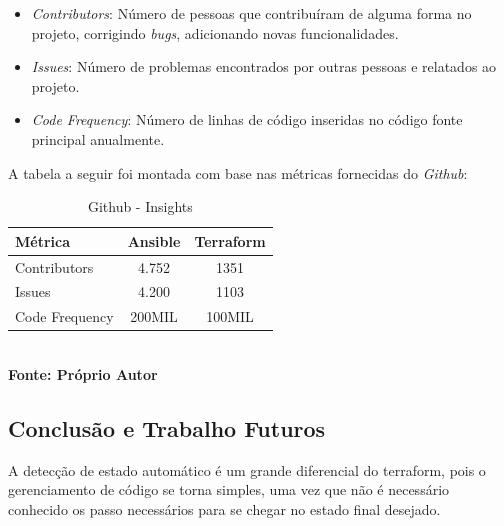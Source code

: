 \begin{itemize}
    \item  \textit{Contributors}: Número de pessoas que contribuíram de alguma forma no projeto, corrigindo \textit{bugs}, adicionando novas funcionalidades.
     \item \textit{Issues}: Número de problemas encontrados por outras pessoas e relatados ao projeto. 
     \item \textit{Code Frequency}: Número de linhas de código inseridas no código fonte principal anualmente. 
\end{itemize}

A tabela a seguir foi montada com base nas métricas fornecidas do \textit{Github}: 
   
  
\begin{table}[ht]
	\centering
	\caption{\hspace{0.1cm} Github - Insights}
	\vspace{-0.3cm} %
	\label{tab:tabela2}
	\begin{tabular}{l|c|c}
  \hline
    \textbf{Métrica}	& \textbf{Ansible} & \textbf{Terraform} \\
    \hline
  Contributors & 4.752  & 1351\\
  Issues   & 4.200   & 1103     \\
  Code Frequency  & 200MIL  &   100MIL  \\
     \hline
 \end{tabular}
 	\vspace{.1cm}  %
	\small
	{\footnotesize\\ \textbf{Fonte: Próprio Autor}}
\end{table}




\subsection{Conclusão e Trabalho Futuros}
A detecção de estado automático é um grande diferencial do terraform, pois o gerenciamento de código se torna simples, uma vez que não é necessário conhecido os passo necessários para se chegar no estado final desejado.

